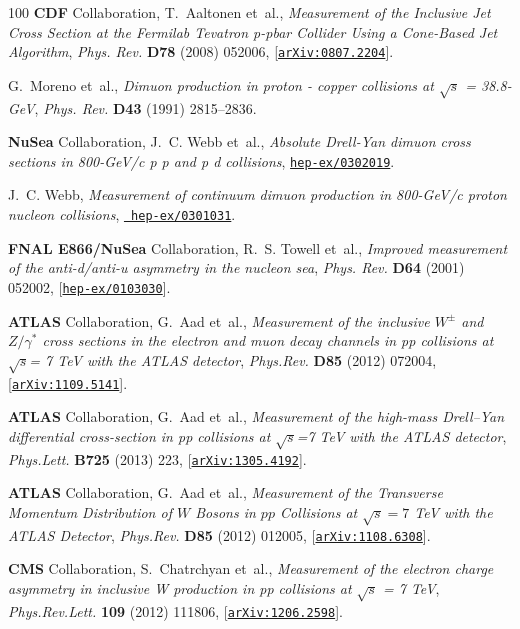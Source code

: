 \begin{thebibliography}{100}
{\bf CDF} Collaboration, T.~Aaltonen et~al., {\it {Measurement of the Inclusive
  Jet Cross Section at the Fermilab Tevatron p-pbar Collider Using a Cone-Based
  Jet Algorithm}},  {\em Phys. Rev.} {\bf D78} (2008) 052006,
  [\href{http://arxiv.org/abs/0807.2204}{{\tt arXiv:0807.2204}}].

G.~Moreno et~al., {\it {Dimuon production in proton - copper collisions at
  $\sqrt{s}$ = 38.8-GeV}},  {\em Phys. Rev.} {\bf D43} (1991) 2815--2836.

{\bf NuSea} Collaboration, J.~C. Webb et~al., {\it {Absolute Drell-Yan dimuon
  cross sections in 800-GeV/c p p and p d collisions}},
  \href{http://arxiv.org/abs/hep-ex/0302019}{{\tt hep-ex/0302019}}.

J.~C. Webb, {\it {Measurement of continuum dimuon production in 800-GeV/c
  proton nucleon collisions}},  \href{http://arxiv.org/abs/hep-ex/0301031}{{\tt
  hep-ex/0301031}}.

{\bf FNAL E866/NuSea} Collaboration, R.~S. Towell et~al., {\it {Improved
  measurement of the anti-d/anti-u asymmetry in the nucleon sea}},  {\em Phys.
  Rev.} {\bf D64} (2001) 052002,
  [\href{http://arxiv.org/abs/hep-ex/0103030}{{\tt hep-ex/0103030}}].

{\bf ATLAS} Collaboration, G.~Aad et~al., {\it {Measurement of the inclusive
  $W^{\pm}$ and $Z/\gamma^*$ cross sections in the electron and muon decay
  channels in pp collisions at $\sqrt{s}$= 7 TeV with the ATLAS detector}},
  {\em Phys.Rev.} {\bf D85} (2012) 072004,
  [\href{http://arxiv.org/abs/1109.5141}{{\tt arXiv:1109.5141}}].

{\bf ATLAS} Collaboration, G.~Aad et~al., {\it {Measurement of the high-mass
  Drell--Yan differential cross-section in pp collisions at $\sqrt{s}$=7 TeV
  with the ATLAS detector}},  {\em Phys.Lett.} {\bf B725} (2013) 223,
  [\href{http://arxiv.org/abs/1305.4192}{{\tt arXiv:1305.4192}}].

{\bf ATLAS} Collaboration, G.~Aad et~al., {\it {Measurement of the Transverse
  Momentum Distribution of $W$ Bosons in $pp$ Collisions at $\sqrt{s}=7$ TeV
  with the ATLAS Detector}},  {\em Phys.Rev.} {\bf D85} (2012) 012005,
  [\href{http://arxiv.org/abs/1108.6308}{{\tt arXiv:1108.6308}}].

{\bf CMS} Collaboration, S.~Chatrchyan et~al., {\it {Measurement of the
  electron charge asymmetry in inclusive W production in pp collisions at
  $\sqrt{s}$ = 7 TeV}},  {\em Phys.Rev.Lett.} {\bf 109} (2012) 111806,
  [\href{http://arxiv.org/abs/1206.2598}{{\tt arXiv:1206.2598}}].


\end{thebibliography}
